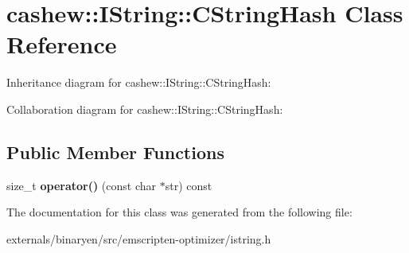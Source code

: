 \hypertarget{classcashew_1_1_i_string_1_1_c_string_hash}{}\section{cashew\+:\+:I\+String\+:\+:C\+String\+Hash Class Reference}
\label{classcashew_1_1_i_string_1_1_c_string_hash}


Inheritance diagram for cashew\+:\+:I\+String\+:\+:C\+String\+Hash\+:


Collaboration diagram for cashew\+:\+:I\+String\+:\+:C\+String\+Hash\+:
\subsection*{Public Member Functions}
\begin{DoxyCompactItemize}
\item 
\mbox{\label{classcashew_1_1_i_string_1_1_c_string_hash_a89372fc31885979e1ddb02e190c495ff}} 
size\+\_\+t {\bfseries operator()} (const char $\ast$str) const
\end{DoxyCompactItemize}


The documentation for this class was generated from the following file\+:\begin{DoxyCompactItemize}
\item 
externals/binaryen/src/emscripten-\/optimizer/istring.\+h\end{DoxyCompactItemize}
